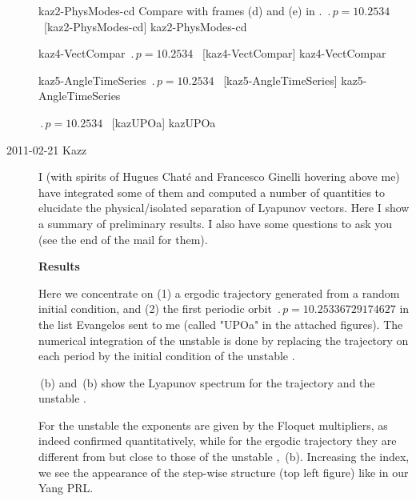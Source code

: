 \begin{description}
{kaz2-PhysModes-cd}   %
{}   %
{    %
Compare with frames (d) and (e) in .
$\period{p}=10.2534$ \po\ [kaz2-PhysModes-cd]
}
{kaz2-PhysModes-cd}   %

{kaz4-VectCompar}   %
{}   %
{    %
$\period{p}=10.2534$ \po\ [kaz4-VectCompar]
}
{kaz4-VectCompar}   %

{kaz5-AngleTimeSeries}   %
{}   %
{    %
$\period{p}=10.2534$ \po\ [kaz5-AngleTimeSeries]
}
{kaz5-AngleTimeSeries}   %

{}   %
{    %
$\period{p}=10.2534$ \po\ [kazUPOa]
}
{kazUPOa}   %

\item[2011-02-21 Kazz]
I (with spirits of Hugues Chat\'e and Francesco Ginelli hovering above me)
have integrated some of
them and computed a number of quantities to elucidate the
physical/isolated separation of Lyapunov vectors. Here I show a
summary of preliminary results. I also have some questions to ask you
(see the end of the mail for them).


\textbf{Results}

Here we concentrate on (1) a ergodic trajectory generated from a random
initial condition, and (2) the first periodic orbit 
$\period{p}=10.25336729174627$ in the list
Evangelos sent to me (called "UPOa" in the attached
figures). The numerical integration of the {unstable \po} is done by replacing the
trajectory on each period by the initial condition of the {unstable \po}.

\,(b)
and
\,(b)  
show the Lyapunov spectrum for
the trajectory and the {unstable \po}.
 
For the {unstable \po} the exponents are 
given by the Floquet multipliers, as indeed confirmed quantitatively,
while for the ergodic trajectory they are different from but close to
those of the {unstable \po}, \,(b).
Increasing the index, we 
see the appearance of the step-wise structure (top left figure) like in
our Yang \etal{} PRL.


\end{description}
